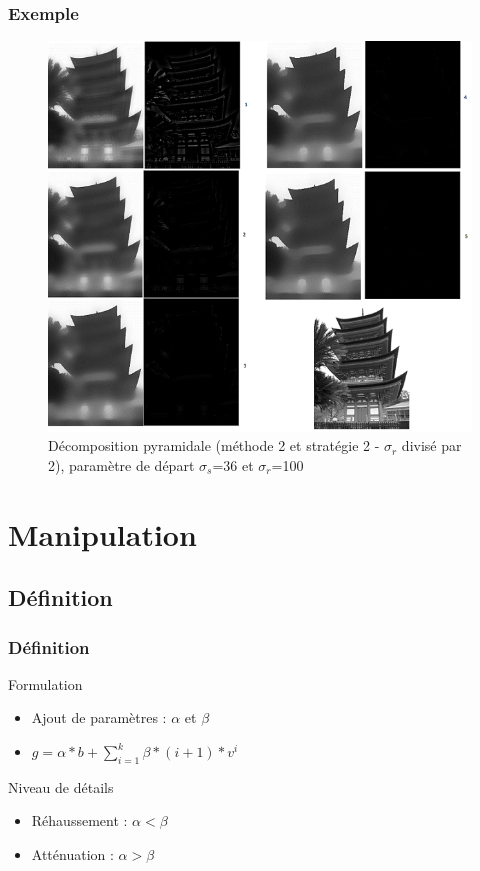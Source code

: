 \documentclass[compress]{beamer}
\begin{document}
\begin{frame}\frametitle{Exemple}
\begin{figure}
	\begin{center} 
		\includegraphics[scale=0.4]{images/pyramide2_rdiv2__36_100_IM088.png} 
	\end{center} 
	\caption{Décomposition pyramidale (méthode 2 et stratégie 2 - $\sigma_r$ divisé par 2), paramètre de départ $\sigma_s$=36 et $\sigma_r$=100}
\end{figure}
\end{frame}

\section{Manipulation}
\subsection{Définition}
\begin{frame}\frametitle{Définition}
	\begin{block}{Formulation}
		\begin{itemize}
			\item Ajout de paramètres : $\alpha$ et $\beta$
			\item $g = \alpha*b + \sum^{k}_{i=1}\beta*(i+1)*v^{i}$
		\end{itemize}
	\end{block}
\pause
	\begin{block}{Niveau de détails}
		\begin{itemize}
			\item Réhaussement : $\alpha < \beta$
			\item Atténuation : $\alpha > \beta$
		\end{itemize}
	\end{block}
	
\end{frame}
\end{document}
